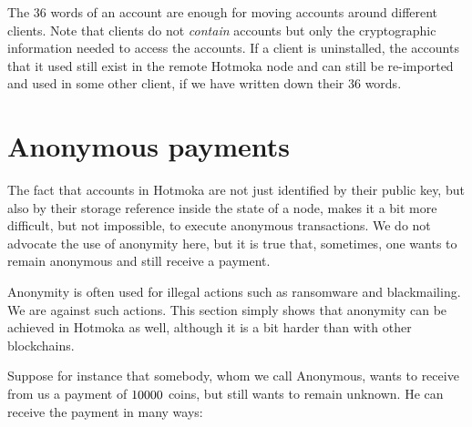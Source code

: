 \begin{commentbox}
The 36 words of an account are enough for moving accounts around
different clients. Note that clients do not \emph{contain} accounts
but only the cryptographic information
needed to access the accounts. If a client is uninstalled,
the accounts that it used still exist in the remote
Hotmoka node and can still be re-imported and used
in some other client, if we have written down their 36 words.
\end{commentbox}

\section{Anonymous payments}\label{sec:anonymous_payments}

The fact that accounts in Hotmoka are not just identified by their public key, but also by their
storage reference inside the state of a node, makes it a bit more difficult, but not impossible,
to execute anonymous transactions. We do not advocate the use of anonymity here, but it is true
that, sometimes, one wants to remain anonymous and still receive a payment.

\begin{commentbox}
Anonymity is often used for illegal actions such as ransomware and blackmailing.
We are against such actions. This section simply shows that anonymity can be achieved
in Hotmoka as well, although it is a bit harder than with other blockchains.
\end{commentbox}

Suppose for instance that somebody, whom we call Anonymous, wants to receive from us a payment
of $10000{}$ coins,
but still wants to remain unknown. He can receive the payment in many ways:

